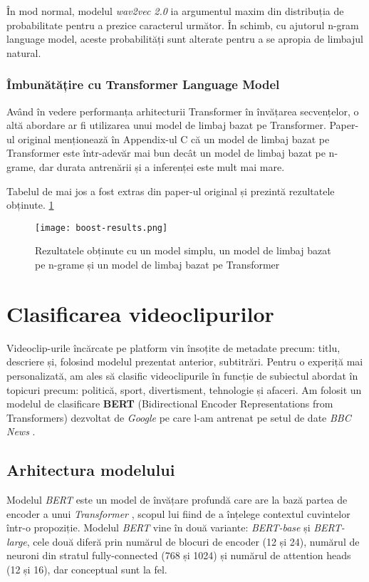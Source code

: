 \par
În mod normal, modelul \textit{wav2vec 2.0} ia argumentul maxim din distribuția de probabilitate
pentru a prezice caracterul următor. În schimb, cu ajutorul n-gram language model, aceste
probabilități sunt alterate pentru a se apropia de limbajul natural. 

\subsubsection{Îmbunătățire cu Transformer Language Model}
\vspace{1em}
Având în vedere performanța arhitecturii Transformer în învățarea secvențelor, o altă abordare
ar fi utilizarea unui model de limbaj bazat pe Transformer. Paper-ul original \cite{wav2vec2}
menționează în Appendix-ul C că un model de limbaj bazat pe Transformer este într-adevăr mai
bun decât un model de limbaj bazat pe n-grame, dar durata antrenării și a inferenței este
mult mai mare. 
\par 
Tabelul de mai jos a fost extras din paper-ul original și prezintă rezultatele obținute. \ref{fig:boost-results}

\begin{figure}[h!]
    \centering
    \texttt{[image: boost-results.png]}
    \caption{Rezultatele obținute cu un model simplu, un model de limbaj bazat pe n-grame și un model de limbaj bazat pe Transformer}
    \label{fig:boost-results}
\end{figure}


\section{Clasificarea videoclipurilor}
\label{sec:clasificare-videoclipuri}
Videoclip-urile încărcate pe platform vin însoțite de metadate precum: titlu, descriere și, folosind
modelul prezentat anterior, subtitrări. Pentru o experiță mai personalizată, am ales să clasific
videoclipurile în funcție de subiectul abordat în topicuri precum: politică, sport, divertisment,
tehnologie și afaceri. Am folosit un modelul de clasificare \textbf{BERT} (Bidirectional Encoder Representations
from Transformers) dezvoltat de \textit{Google} \cite{devlin2019bert} pe care l-am antrenat pe setul de date
\textit{BBC News} \cite{greene06icml}.

\subsection{Arhitectura modelului}
Modelul \textit{BERT} este un model de învățare profundă care are la bază partea de encoder a unui \textit{Transformer} \cite{vaswani2023attention},
scopul lui fiind de a înțelege contextul cuvintelor într-o propoziție. Modelul \textit{BERT} vine în două
variante: \textit{BERT-base} și \textit{BERT-large}, cele două diferă prin numărul de blocuri de encoder (12 și 24),
numărul de neuroni din stratul fully-connected (768 și 1024) și numărul de attention heads (12 și 16), dar 
conceptual sunt la fel. 

